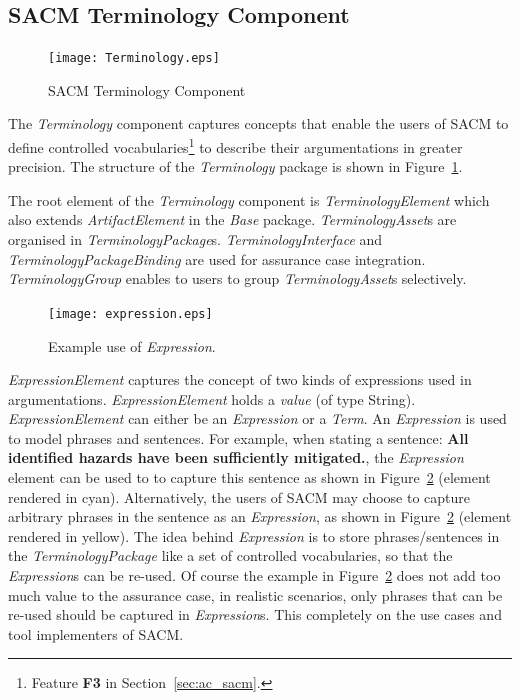 \subsection{SACM Terminology Component}
\label{sec:termPack}
\begin{figure}[ht!]
	\centering
	\texttt{[image: Terminology.eps]}
	\caption{SACM Terminology Component}
	\label{fig:term}
\end{figure}
The \textit{Terminology} component captures concepts that enable the users of SACM to define controlled vocabularies\footnote{Feature \textbf{F3} in Section~\ref{sec:ac_sacm}.} to describe their argumentations in greater precision. 
The structure of the \textit{Terminology} package is shown in Figure~\ref{fig:term}.

The root element of the \textit{Terminology} component is \textit{TerminologyElement} which also extends \textit{ArtifactElement} in the \textit{Base} package. 
\textit{TerminologyAsset}s are organised in \textit{TerminologyPackage}s. 
\textit{TerminologyInterface} and \textit{TerminologyPackageBinding} are used for assurance case integration. 
\textit{TerminologyGroup} enables to users to group \textit{TerminologyAsset}s selectively.

\begin{figure}
	\centering
	\texttt{[image: expression.eps]}
	\caption{Example use of \textit{Expression}.}
	\label{fig:expression}
\end{figure}

\textit{ExpressionElement} captures the concept of two kinds of expressions used in argumentations. \textit{ExpressionElement} holds a \textit{value} (of type String). 
\textit{ExpressionElement} can either be an \textit{Expression} or a \textit{Term}. 
An \textit{Expression} is used to model phrases and sentences. 
For example, when stating a sentence: \textbf{All identified hazards have been sufficiently mitigated.}, the \textit{Expression} element can be used to to capture this sentence as shown in Figure~\ref{fig:expression} (element rendered in cyan). 
Alternatively, the users of SACM may choose to capture arbitrary phrases in the sentence as an \textit{Expression}, as shown in Figure~\ref{fig:expression} (element rendered in yellow). 
The idea behind \textit{Expression} is to store phrases/sentences in the \textit{TerminologyPackage} like a set of controlled vocabularies, so that the \textit{Expression}s can be re-used. 
Of course the example in Figure~\ref{fig:expression} does not add too much value to the assurance case, in realistic scenarios, only phrases that can be re-used should be captured in \textit{Expression}s. 
This completely on the use cases and tool implementers of SACM. 

